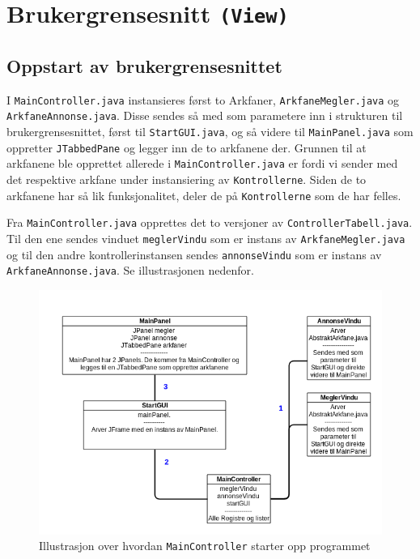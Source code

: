 \section{Brukergrensesnitt \texttt{(View)}} \label{sec:brukergrensesnitt}


\subsection{Oppstart av brukergrensesnittet}
I \texttt{MainController.java} instansieres først to Arkfaner, \texttt{ArkfaneMegler.java} og \texttt{ArkfaneAnnonse.java}.
Disse sendes så med som parametere inn i strukturen til brukergrensesnittet, først til \texttt{StartGUI.java}, og så videre til \texttt{MainPanel.java} som oppretter \texttt{JTabbedPane} og legger inn de to arkfanene der.
Grunnen til at arkfanene ble opprettet allerede i \texttt{MainController.java} er fordi vi sender med det respektive arkfane under instansiering av \texttt{Kontrollerne}. 
Siden de to arkfanene har så lik funksjonalitet, deler de på \texttt{Kontrollerne} som de har felles.

Fra \texttt{MainController.java} opprettes det to versjoner av \texttt{ControllerTabell.java}. Til den ene sendes vinduet \texttt{meglerVindu} som er instans av \texttt{ArkfaneMegler.java} og til den andre kontrollerinstansen sendes \texttt{annonseVindu} som er instans av \texttt{ArkfaneAnnonse.java}.
Se illustrasjonen nedenfor.
\begin{figure}[ht]
\includegraphics[width=\textwidth,height=\textheight,keepaspectratio]{./img/produktdokumentasjon/bilder/Controller_og_GUI-opprettelse2.png}
\caption{Illustrasjon over hvordan \texttt{MainController} starter opp programmet}
\end{figure}


